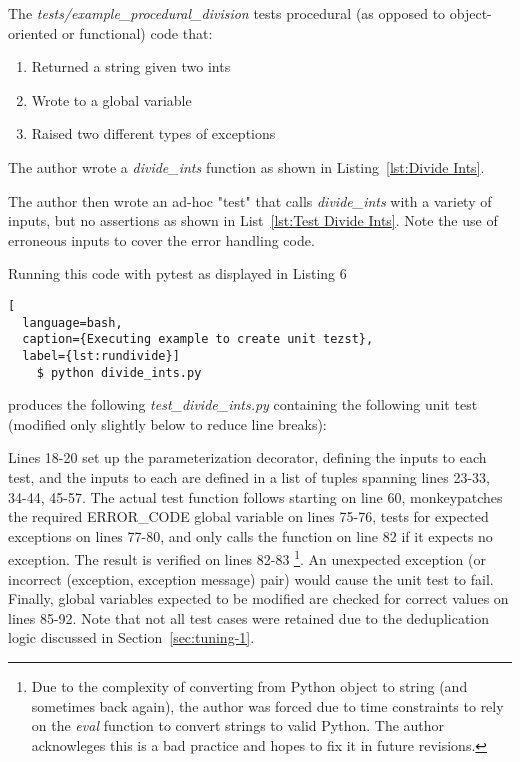 \documentclass[10pt, conference]{IEEEtran}
\begin{document}
The \textit{tests/example\_procedural\_division} tests procedural (as opposed 
to object-oriented or functional) code that:  

\begin{enumerate}
    \item Returned a string given two ints
    \item Wrote to a global variable
    \item Raised two different types of exceptions
\end{enumerate}

The author wrote a \textit{divide\_ints} function as shown 
in Listing~\ref{lst:Divide Ints}.



The author then wrote an ad-hoc "test" that calls 
\textit{divide\_ints} with a variety of inputs, but no assertions
as shown in List~\ref{lst:Test Divide Ints}.  Note the use of erroneous inputs
to cover the error handling code.



Running this code with pytest as displayed in Listing 6

\begin{lstlisting}[
  language=bash, 
  caption={Executing example to create unit tezst},
  label={lst:rundivide}]
    $ python divide_ints.py
\end{lstlisting}
    
produces the following \textit{test\_divide\_ints.py} containing the following 
unit test (modified only slightly below to reduce line breaks):



Lines 18-20 set up the parameterization decorator, defining the inputs to each test,
and the inputs to each are defined in a list of tuples spanning lines 23-33, 
34-44, 45-57.  The actual test function follows starting on line 60, monkeypatches
the required ERROR\_CODE global variable on lines 75-76, tests for expected 
exceptions on lines 77-80, and only calls the function on line 82 if it expects 
no exception. The result is verified on lines 82-83 \footnote{Due 
to the complexity of converting from Python object to string
(and sometimes back again), the author was forced due to time constraints to
rely on the \textit{eval} function to convert strings to valid Python.  
The author acknowleges this is a bad practice and hopes to fix it in
future revisions.}. An unexpected exception (or incorrect 
(exception, exception message) 
pair) would cause the unit test to fail.  Finally, global variables expected to be modified 
are checked for correct values on lines 85-92.  Note that not all test cases 
were retained due to the deduplication logic discussed in Section~\ref{sec:tuning-1}.
\end{document}
